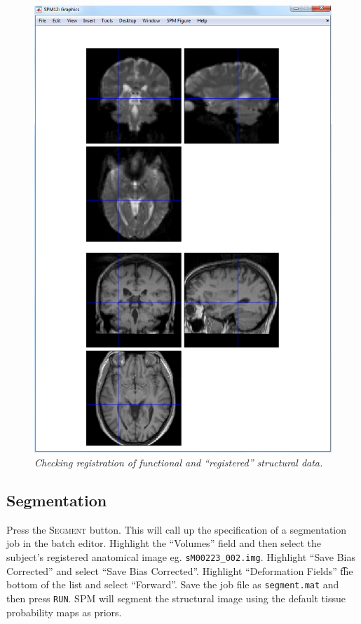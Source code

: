 \begin{figure}
\begin{center}
\includegraphics[width=125mm]{auditory/checkreg}
\caption{\em Checking registration of functional and ``registered'' structural data. \label{aud_checkreg}}
\end{center}
\end{figure}

\subsection{Segmentation}

Press the \textsc{Segment} button. This will call up the specification of a segmentation job in the batch editor. Highlight the ``Volumes'' field and then select the subject's registered anatomical image eg. \texttt{sM00223\_002.img}. Highlight ``Save Bias Corrected'' and select ``Save Bias Corrected''. Highlight ``Deformation Fields'' \t the bottom of the list and select ``Forward''. Save the job file as \texttt{segment.mat} and then press \texttt{RUN}. SPM will segment the structural image using the default tissue probability maps as priors. 

